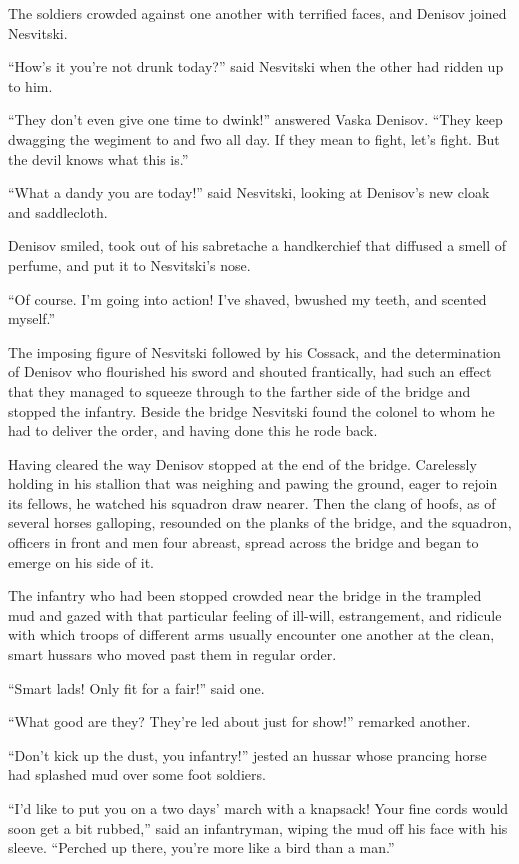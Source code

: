 The soldiers crowded against one another with terrified faces,
and Denisov joined Nesvitski.

``How's it you're not drunk today?'' said Nesvitski when the
other had ridden up to him.

``They don't even give one time to dwink!'' answered Vaska
Denisov. ``They keep dwagging the wegiment to and fwo all day. If
they mean to fight, let's fight. But the devil knows what this
is.''

``What a dandy you are today!'' said Nesvitski, looking at
Denisov's new cloak and saddlecloth.

Denisov smiled, took out of his sabretache a handkerchief that
diffused a smell of perfume, and put it to Nesvitski's nose.

``Of course. I'm going into action! I've shaved, bwushed my
teeth, and scented myself.''

The imposing figure of Nesvitski followed by his Cossack, and the
determination of Denisov who flourished his sword and shouted
frantically, had such an effect that they managed to squeeze
through to the farther side of the bridge and stopped the
infantry. Beside the bridge Nesvitski found the colonel to whom
he had to deliver the order, and having done this he rode back.

Having cleared the way Denisov stopped at the end of the bridge.
Carelessly holding in his stallion that was neighing and pawing
the ground, eager to rejoin its fellows, he watched his squadron
draw nearer. Then the clang of hoofs, as of several horses
galloping, resounded on the planks of the bridge, and the
squadron, officers in front and men four abreast, spread across
the bridge and began to emerge on his side of it.

The infantry who had been stopped crowded near the bridge in the
trampled mud and gazed with that particular feeling of ill-will,
estrangement, and ridicule with which troops of different arms
usually encounter one another at the clean, smart hussars who
moved past them in regular order.

``Smart lads! Only fit for a fair!'' said one.

``What good are they? They're led about just for show!'' remarked
another.

``Don't kick up the dust, you infantry!'' jested an hussar whose
prancing horse had splashed mud over some foot soldiers.

``I'd like to put you on a two days' march with a knapsack! Your
fine cords would soon get a bit rubbed,'' said an infantryman,
wiping the mud off his face with his sleeve. ``Perched up there,
you're more like a bird than a man.''

